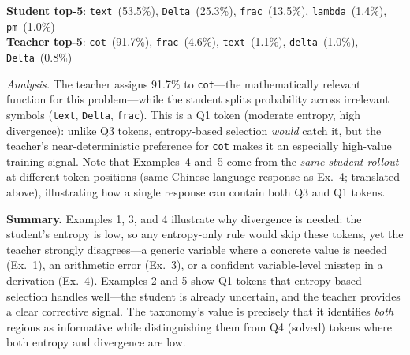 \documentclass{article}
\begin{document}
\begin{tcolorbox}[colback=yellow!5, colframe=black, boxrule=0.5pt, title={Token distributions}]
\small
\textbf{Student top-5}: \texttt{text}~(53.5\%), \texttt{Delta}~(25.3\%), \texttt{frac}~(13.5\%), \texttt{lambda}~(1.4\%), \texttt{pm}~(1.0\%) \\
\textbf{Teacher top-5}: \texttt{cot}~(91.7\%), \texttt{frac}~(4.6\%), \texttt{text}~(1.1\%), \texttt{delta}~(1.0\%), \texttt{Delta}~(0.8\%)
\end{tcolorbox}

\noindent\textit{Analysis.}
The teacher assigns 91.7\% to \texttt{cot}---the mathematically relevant function for this problem---while the student splits probability across irrelevant symbols (\texttt{text}, \texttt{Delta}, \texttt{frac}).
This is a Q1 token (moderate entropy, high divergence): unlike Q3 tokens, entropy-based selection \emph{would} catch it, but the teacher's near-deterministic preference for \texttt{cot} makes it an especially high-value training signal.
Note that Examples~4 and~5 come from the \emph{same student rollout} at different token positions (same Chinese-language response as Ex.~4; translated above), illustrating how a single response can contain both Q3 and Q1 tokens.

\medskip
\noindent\textbf{Summary.}
Examples 1, 3, and 4 illustrate why divergence is needed: the student's entropy is low, so any entropy-only rule would skip these tokens, yet the teacher strongly disagrees---a generic variable where a concrete value is needed (Ex.~1), an arithmetic error (Ex.~3), or a confident variable-level misstep in a derivation (Ex.~4).
Examples 2 and 5 show Q1 tokens that entropy-based selection handles well---the student is already uncertain, and the teacher provides a clear corrective signal.
The taxonomy's value is precisely that it identifies \emph{both} regions as informative while distinguishing them from Q4 (solved) tokens where both entropy and divergence are low.
\end{document}

